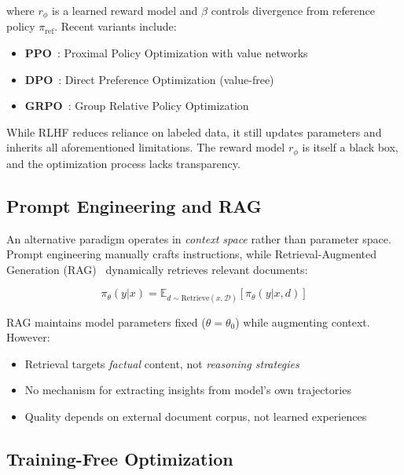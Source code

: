 where $r_\phi$ is a learned reward model and $\beta$ controls divergence from reference policy $\pi_{\text{ref}}$. Recent variants include:

\begin{itemize}
    \item \textbf{PPO}~\cite{schulman2017proximal}: Proximal Policy Optimization with value networks
    \item \textbf{DPO}~\cite{rafailov2023direct}: Direct Preference Optimization (value-free)
    \item \textbf{GRPO}~\cite{shao2024deepseekmath}: Group Relative Policy Optimization
\end{itemize}

While RLHF reduces reliance on labeled data, it still updates parameters and inherits all aforementioned limitations. The reward model $r_\phi$ is itself a black box, and the optimization process lacks transparency.

\subsection{Prompt Engineering and RAG}

An alternative paradigm operates in \textit{context space} rather than parameter space. Prompt engineering manually crafts instructions, while Retrieval-Augmented Generation (RAG)~\cite{lewis2020retrieval} dynamically retrieves relevant documents:

\begin{equation}
\pi_\theta(y | x) = \mathbb{E}_{d \sim \text{Retrieve}(x, \mathcal{D})}[\pi_\theta(y | x, d)]
\end{equation}

RAG maintains model parameters fixed ($\theta = \theta_0$) while augmenting context. However:

\begin{itemize}
    \item Retrieval targets \textit{factual} content, not \textit{reasoning strategies}
    \item No mechanism for extracting insights from model's own trajectories
    \item Quality depends on external document corpus, not learned experiences
\end{itemize}

\subsection{Training-Free Optimization}

